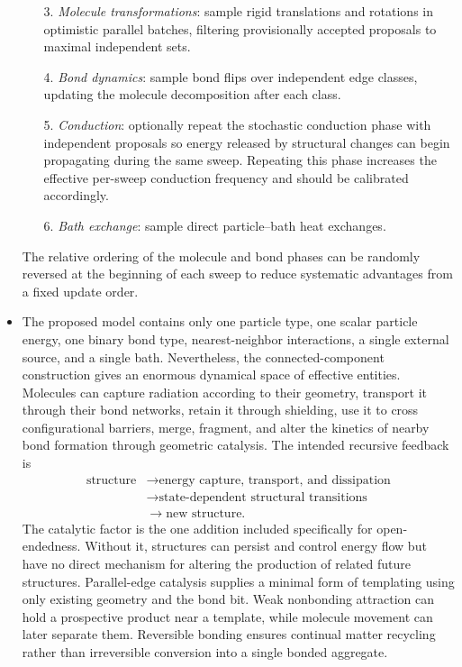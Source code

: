 \documentclass[12pt,letterpaper]{article}
\begin{document}
\begin{itemize}
\begin{itemize}
\item[3.] \emph{Molecule transformations}: sample rigid translations and rotations in optimistic parallel batches, filtering provisionally accepted proposals to maximal independent sets.
\item[4.] \emph{Bond dynamics}: sample bond flips over independent edge classes, updating the molecule decomposition after each class.
\item[5.] \emph{Conduction}: optionally repeat the stochastic conduction phase with independent proposals so energy released by structural changes can begin propagating during the same sweep. Repeating this phase increases the effective per-sweep conduction frequency and should be calibrated accordingly.
\item[6.] \emph{Bath exchange}: sample direct particle--bath heat exchanges.
\end{itemize}
The relative ordering of the molecule and bond phases can be randomly reversed at the beginning of each sweep to reduce systematic advantages from a fixed update order. %
\item The proposed model contains only one particle type, one scalar particle energy, one binary bond type, nearest-neighbor interactions, a single external source, and a single bath. Nevertheless, the connected-component construction gives an enormous dynamical space of effective entities. Molecules can capture radiation according to their geometry, transport it through their bond networks, retain it through shielding, use it to cross configurational barriers, merge, fragment, and alter the kinetics of nearby bond formation through geometric catalysis. The intended recursive feedback is
\begin{align*}
\textrm{structure} &\longrightarrow \textrm{energy capture, transport, and dissipation} \\
&\longrightarrow \textrm{state-dependent structural transitions} \\
&\longrightarrow \textrm{new structure}.
\end{align*}
The catalytic factor is the one addition included specifically for open-endedness. Without it, structures can persist and control energy flow but have no direct mechanism for altering the production of related future structures. Parallel-edge catalysis supplies a minimal form of templating using only existing geometry and the bond bit. Weak nonbonding attraction can hold a prospective product near a template, while molecule movement can later separate them. Reversible bonding ensures continual matter recycling rather than irreversible conversion into a single bonded aggregate.

\end{itemize}
\end{document}

